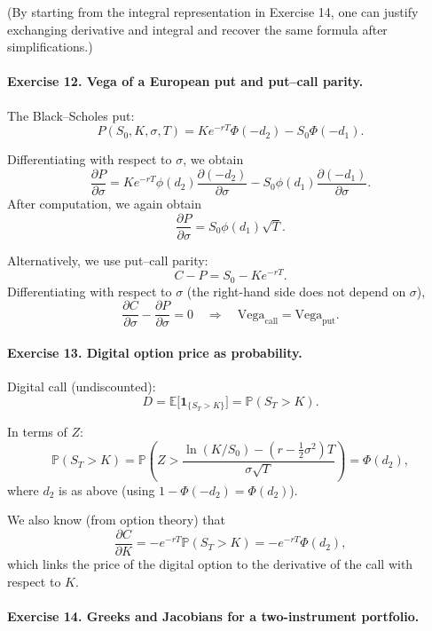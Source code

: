 \documentclass[11pt]{article}
\begin{document}
(By starting from the integral representation in Exercise 14, one can justify exchanging derivative and integral and recover the same formula after simplifications.)

\bigskip

\paragraph{Exercise 12. Vega of a European put and put--call parity.}

The Black--Scholes put:
\[
P(S_0,K,\sigma,T)=K e^{-rT}\Phi(-d_2)-S_0\Phi(-d_1).
\]

Differentiating with respect to \(\sigma\), we obtain
\[
\frac{\partial P}{\partial \sigma}
= K e^{-rT}\phi(d_2)\frac{\partial(-d_2)}{\partial \sigma}
- S_0\phi(d_1)\frac{\partial(-d_1)}{\partial \sigma}.
\]
After computation, we again obtain
\[
\frac{\partial P}{\partial \sigma}
= S_0\phi(d_1)\sqrt{T}.
\]

Alternatively, we use put–call parity:
\[
C-P = S_0 - K e^{-rT}.
\]
Differentiating with respect to \(\sigma\) (the right-hand side does not depend on \(\sigma\)),
\[
\frac{\partial C}{\partial \sigma} - \frac{\partial P}{\partial \sigma} =0
\quad\Rightarrow\quad
\text{Vega}_{\text{call}} = \text{Vega}_{\text{put}}.
\]

\bigskip

\paragraph{Exercise 13. Digital option price as probability.}

Digital call (undiscounted):
\[
D = \mathbb{E}\big[\mathbf{1}_{\{S_T>K\}}\big]
= \mathbb{P}(S_T>K).
\]

In terms of \(Z\):
\[
\mathbb{P}(S_T>K) = \mathbb{P}\left(Z > \frac{\ln(K/S_0)-(r-\tfrac12\sigma^2)T}{\sigma\sqrt{T}}\right)
= \Phi(d_2),
\]
where \(d_2\) is as above (using \(1-\Phi(-d_2)=\Phi(d_2)\)).

We also know (from option theory) that
\[
\frac{\partial C}{\partial K} = -e^{-rT}\mathbb{P}(S_T>K) = -e^{-rT}\Phi(d_2),
\]
which links the price of the digital option to the derivative of the call with respect to \(K\).

\bigskip

\paragraph{Exercise 14. Greeks and Jacobians for a two-instrument portfolio.}
\end{document}
